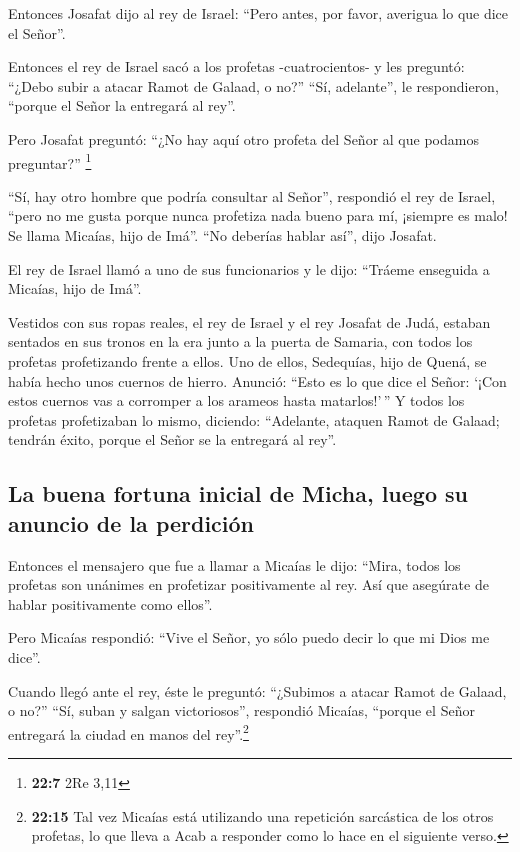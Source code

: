  Entonces Josafat dijo al rey de Israel: ``Pero antes, por
favor, averigua lo que dice el Señor''.

 Entonces el rey de Israel sacó a los profetas
-cuatrocientos- y les preguntó: ``¿Debo subir a atacar Ramot de Galaad,
o no?'' ``Sí, adelante'', le respondieron, ``porque el Señor la
entregará al rey''.

 Pero Josafat preguntó: ``¿No hay aquí otro profeta del
Señor al que podamos preguntar?'' \footnote{\textbf{22:7} 2Re 3,11}

 ``Sí, hay otro hombre que podría consultar al Señor'',
respondió el rey de Israel, ``pero no me gusta porque nunca profetiza
nada bueno para mí, ¡siempre es malo! Se llama Micaías, hijo de Imá''.
``No deberías hablar así'', dijo Josafat.

 El rey de Israel llamó a uno de sus funcionarios y le
dijo: ``Tráeme enseguida a Micaías, hijo de Imá''.

 Vestidos con sus ropas reales, el rey de Israel y el rey
Josafat de Judá, estaban sentados en sus tronos en la era junto a la
puerta de Samaria, con todos los profetas profetizando frente a ellos.
 Uno de ellos, Sedequías, hijo de Quená, se había hecho
unos cuernos de hierro. Anunció: ``Esto es lo que dice el Señor: `¡Con
estos cuernos vas a corromper a los arameos hasta matarlos!'\,''
 Y todos los profetas profetizaban lo mismo, diciendo:
``Adelante, ataquen Ramot de Galaad; tendrán éxito, porque el Señor se
la entregará al rey''.

\hypertarget{la-buena-fortuna-inicial-de-micha-luego-su-anuncio-de-la-perdiciuxf3n}{%
\subsection{La buena fortuna inicial de Micha, luego su anuncio de la
perdición}\label{la-buena-fortuna-inicial-de-micha-luego-su-anuncio-de-la-perdiciuxf3n}}

 Entonces el mensajero que fue a llamar a Micaías le
dijo: ``Mira, todos los profetas son unánimes en profetizar
positivamente al rey. Así que asegúrate de hablar positivamente como
ellos''.

 Pero Micaías respondió: ``Vive el Señor, yo sólo puedo
decir lo que mi Dios me dice''.

 Cuando llegó ante el rey, éste le preguntó: ``¿Subimos a
atacar Ramot de Galaad, o no?'' ``Sí, suban y salgan victoriosos'',
respondió Micaías, ``porque el Señor entregará la ciudad en manos del
rey''.\footnote{\textbf{22:15} Tal vez Micaías está utilizando una
  repetición sarcástica de los otros profetas, lo que lleva a Acab a
  responder como lo hace en el siguiente verso.}


